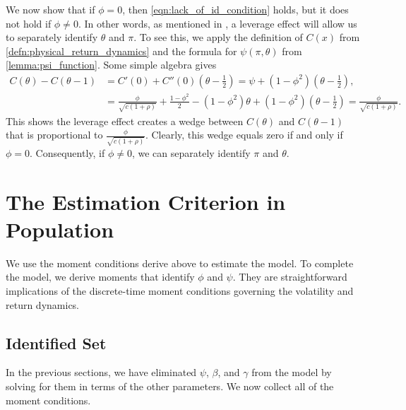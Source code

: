 \documentclass[11pt, letterpaper, twoside]{article}
\begin{document}
We now show that if $\phi = 0$, then \cref{eqn:lack_of_id_condition} holds, but it does not hold if $\phi \neq 0$. In other words, as mentioned in \textcite[13]{han2018leverage}, a leverage effect will allow us to separately identify $\theta$ and $\pi$. To see this, we apply the definition of $C(x)$ from \cref{defn:physical_return_dynamics} and the formula for $\psi(\pi, \theta)$ from \cref{lemma:psi_function}. Some simple algebra gives 
%
\begin{align}
    C(\theta) - C(\theta - 1) &= C'(0) + C''(0) \left(\theta - \frac{1}{2}\right) = \psi + (1 - \phi^2) \left(\theta - \frac{1}{2}\right), \\
%
    &= \frac{\phi}{\sqrt{c (1 + \rho )}} + \frac{1 - \phi^2}{2} - (1 - \phi^2) \theta + (1 - \phi^2) \left(\theta - \frac{1}{2}\right) 
%
    \label{eqn:alpha_difference} 
    = \frac{\phi}{\sqrt{c (1 + \rho )}}. 
\end{align}
%
This shows the leverage effect creates a wedge between $C(\theta)$ and $C(\theta-1)$ that is proportional to $\frac{\phi}{\sqrt{c (1 + \rho )}}$. Clearly, this wedge equals zero if and only if $\phi = 0$. Consequently, if $\phi \neq 0$, we can separately identify $\pi$ and $\theta$.

\section{The Estimation Criterion in Population}\label{sec:EstimationCriterion}

We use the moment conditions derive above to estimate the model. To complete the model, we derive moments that identify $\phi$ and $\psi$.  They are straightforward implications of the discrete-time moment conditions governing the volatility and return dynamics. 

\subsection{Identified Set}\label{sec:identified_set}

In the previous sections, we have eliminated $\psi$, $\beta$, and $\gamma$ from the model by solving for them in terms of the other parameters.
We now collect all of the moment conditions.
\end{document}
